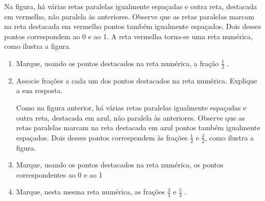 \documentclass[a4,12pt]{book}
\begin{document}
Na figura, há várias retas paralelas igualmente espaçadas e outra reta, destacada em vermelho, não paralela às anteriores. Observe que as retas paralelas marcam na reta destacada em vermelho pontos também igualmente espaçados. Dois desses pontos correspondem ao 0 e ao 1. A reta vermelha torna-se uma reta numérica, como ilustra a figura. 

\begin{enumerate} [\quad a)] %
  \item     Marque, usando os pontos destacados na reta numérica, a fração     $\frac{1}{2}$    . 
  \item     Associe frações a cada um dos pontos destacados na reta numérica. Explique a sua resposta.    \mbox{} \newline      
\begin{center}
\end{center}

Como na figura anterior, há várias retas paralelas igualmente espaçadas e outra reta, destacada em azul, não paralela às anteriores. Observe que as retas paralelas marcam na reta destacada em azul pontos também igualmente espaçados. Dois desses pontos correspondem às frações $\frac{1}{2}$ e $\frac{3}{2}$, como ilustra a figura. 

  \item     Marque, usando os pontos destacados na reta numérica, os pontos correspondentes ao 0 e ao 1
  \item     Marque, nesta mesma reta numérica, as frações     $\frac{3}{4}$     e     $\frac{5}{4}$    .
\begin{center}
  \begin{tikzpicture}[x=56.25mm,y=56.25mm]
 

\end{tikzpicture}
\end{center}
\end{enumerate}
\end{document}
